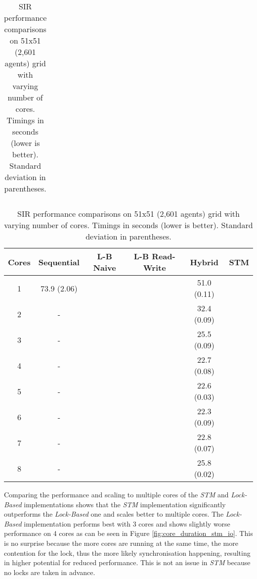 \begin{table}
\begin{tabular}{cc|c}
	\end{tabular}
  	
  	\caption{SIR performance comparisons on 51x51 (2,601 agents) grid with varying number of cores. Timings in seconds (lower is better). Standard deviation in parentheses.}
	\label{tab:constgrid_varyingcores}
\end{table}

\begin{table}
	\centering
  	\begin{tabular}{ c || c | c | c | c | c }
        Cores & Sequential  & L-B Naive & L-B Read-Write & Hybrid    & STM  \\ \hline \hline 
   		1     & 73.9 (2.06) &          &               & 51.0 (0.11) &     \\ \hline
   		2     & -           &          &               & 32.4 (0.09) &      \\ \hline
   		3     & -           &          &               & 25.5 (0.09) &      \\ \hline
   		4     & -           &          &               & 22.7 (0.08) &      \\ \hline
   		5     & -           &          &               & 22.6 (0.03) &      \\ \hline
   		6     & -           &          &               & 22.3 (0.09) &      \\ \hline
   		7     & -           &          &               & 22.8 (0.07) &      \\ \hline
   		8     & -           &          &               & 25.8 (0.02) &      \\ \hline \hline
  	\end{tabular}

  	\caption{SIR performance comparisons on 51x51 (2,601 agents) grid with varying number of cores. Timings in seconds (lower is better). Standard deviation in parentheses.}
	\label{tab:constgrid_varyingcores_arranged}
\end{table}

Comparing the performance and scaling to multiple cores of the \textit{STM} and \textit{Lock-Based} implementations shows that the \textit{STM} implementation significantly outperforms the \textit{Lock-Based} one and scales better to multiple cores. The \textit{Lock-Based} implementation performs best with 3 cores and shows slightly worse performance on 4 cores as can be seen in Figure \ref{fig:core_duration_stm_io}. This is no surprise because the more cores are running at the same time, the more contention for the lock, thus the more likely synchronisation happening, resulting in higher potential for reduced performance. This is not an issue in \textit{STM} because no locks are taken in advance. 

